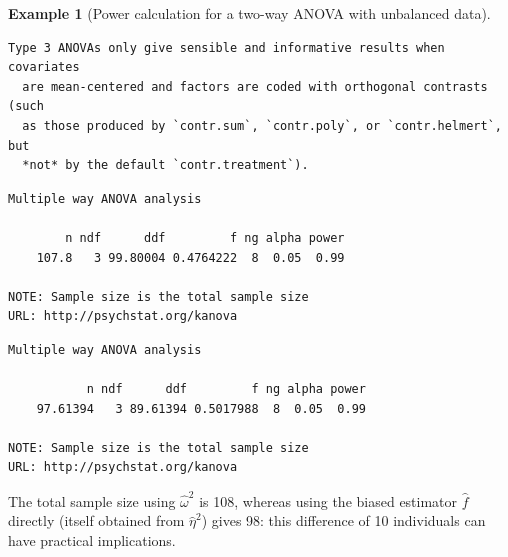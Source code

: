 \documentclass[
  11pt,
  letterpaper,
]{scrbook}
\theoremstyle{definition}
\newtheorem{example}{Example}[chapter]
\theoremstyle{definition}
\theoremstyle{remark}
\begin{document}
\begin{example}[Power calculation for a two-way ANOVA with unbalanced
data]
\begin{verbatim}
Type 3 ANOVAs only give sensible and informative results when covariates
  are mean-centered and factors are coded with orthogonal contrasts (such
  as those produced by `contr.sum`, `contr.poly`, or `contr.helmert`, but
  *not* by the default `contr.treatment`).
\end{verbatim}

\begin{verbatim}
Multiple way ANOVA analysis

        n ndf      ddf         f ng alpha power
    107.8   3 99.80004 0.4764222  8  0.05  0.99

NOTE: Sample size is the total sample size
URL: http://psychstat.org/kanova
\end{verbatim}

\begin{verbatim}
Multiple way ANOVA analysis

           n ndf      ddf         f ng alpha power
    97.61394   3 89.61394 0.5017988  8  0.05  0.99

NOTE: Sample size is the total sample size
URL: http://psychstat.org/kanova
\end{verbatim}

The total sample size using \(\widehat{\omega}^2\) is 108, whereas using
the biased estimator \(\widehat{f}\) directly (itself obtained from
\(\widehat{\eta}^2\)) gives 98: this difference of 10 individuals can
have practical implications.

\end{example}
\end{document}
